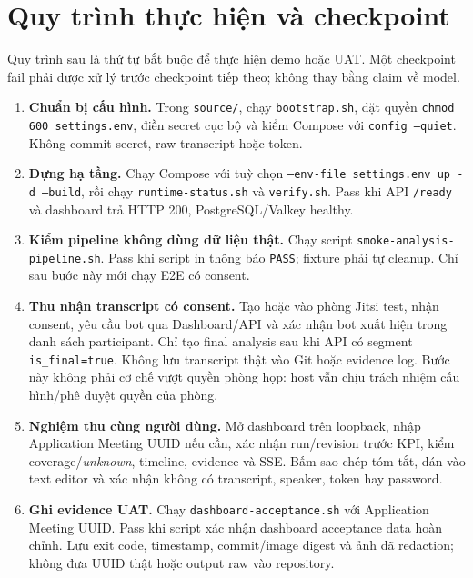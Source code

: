 \section{Quy trình thực hiện và checkpoint}

Quy trình sau là thứ tự bắt buộc để thực hiện demo hoặc UAT. Một checkpoint fail phải được xử lý trước checkpoint tiếp theo; không thay bằng claim về model.

\begin{enumerate}[label=\textbf{B\arabic*.}, leftmargin=1.4cm]
  \item \textbf{Chuẩn bị cấu hình.} Trong \texttt{source/}, chạy \texttt{bootstrap.sh}, đặt quyền \texttt{chmod 600 settings.env}, điền secret cục bộ và kiểm Compose với \texttt{config --quiet}. Không commit secret, raw transcript hoặc token.
  \item \textbf{Dựng hạ tầng.} Chạy Compose với tuỳ chọn \texttt{--env-file settings.env up -d --build}, rồi chạy \texttt{runtime-status.sh} và \texttt{verify.sh}. Pass khi API \texttt{/ready} và dashboard trả HTTP 200, PostgreSQL/Valkey healthy.
  \item \textbf{Kiểm pipeline không dùng dữ liệu thật.} Chạy script \texttt{smoke-\allowbreak analysis-\allowbreak pipeline.sh}. Pass khi script in thông báo \texttt{PASS}; fixture phải tự cleanup. Chỉ sau bước này mới chạy E2E có consent.
  \item \textbf{Thu nhận transcript có consent.} Tạo hoặc vào phòng Jitsi test, nhận consent, yêu cầu bot qua Dashboard/API và xác nhận bot xuất hiện trong danh sách participant. Chỉ tạo final analysis sau khi API có segment \texttt{is\_final=true}. Không lưu transcript thật vào Git hoặc evidence log. Bước này không phải cơ chế vượt quyền phòng họp: host vẫn chịu trách nhiệm cấu hình/phê duyệt quyền của phòng.
  \item \textbf{Nghiệm thu cùng người dùng.} Mở dashboard trên loopback, nhập Application Meeting UUID nếu cần, xác nhận run/revision trước KPI, kiểm coverage/\textit{unknown}, timeline, evidence và SSE. Bấm sao chép tóm tắt, dán vào text editor và xác nhận không có transcript, speaker, token hay password.
  \item \textbf{Ghi evidence UAT.} Chạy \texttt{dashboard-acceptance.sh} với Application Meeting UUID. Pass khi script xác nhận dashboard acceptance data hoàn chỉnh. Lưu exit code, timestamp, commit/image digest và ảnh đã redaction; không đưa UUID thật hoặc output raw vào repository.
\end{enumerate}

